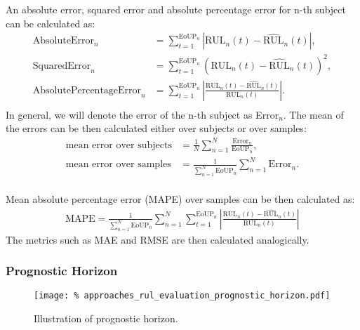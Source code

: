 An absolute error, squared error and absolute percentage error for n-th subject can be calculated as:
\begin{align*}
    \text{AbsoluteError}_n &= \sum_{t=1}^{\text{EoUP}_n}\left|\text{RUL}_n(t) - \widehat{\text{RUL}}_n(t)\right|,\\
    \text{SquaredError}_n &= \sum_{t=1}^{\text{EoUP}_n}{(\text{RUL}_n(t) - \widehat{\text{RUL}}_n(t))^2},\\
    \text{AbsolutePercentageError}_n &= \sum_{t=1}^{\text{EoUP}_n}\left|\frac{\text{RUL}_n(t) - \widehat{\text{RUL}}_n(t)}{\text{RUL}_n(t)}\right|.\\
\end{align*}
In general, we will denote the error of the n-th subject as Error$_n$.
The mean of the errors can be then calculated either over subjects or over samples:
\begin{align*}
    \text{mean error over subjects} &= \frac{1}{N}\sum_{n=1}^{N}\frac{\text{Error}_n}{\text{EoUP}_n},\\
    \text{mean error over samples} &= \frac{1}{\sum_{n=1}^N{{\text{EoUP}_n}}}\sum_{n=1}^{N}{\text{Error}_n}.\\
\end{align*}

Mean absolute percentage error (MAPE) over samples can be then calculated as:
\begin{align*}
    \text{MAPE} = \frac{1}{\sum_{n=1}^N{{\text{EoUP}_n}}}\sum_{n=1}^{N}{\sum_{t=1}^{\text{EoUP}_n}\left|\frac{\text{RUL}_n(t) - \widehat{\text{RUL}}_n(t)}{\text{RUL}_n(t)}\right|}
\end{align*}
The metrics such as MAE and RMSE are then calculated analogically.


\subsubsection{Prognostic Horizon}

\begin{figure}
    \centering
    \texttt{[image: \%
        approaches\_rul\_evaluation\_prognostic\_horizon.pdf]}
    \caption{Illustration of prognostic horizon.}
    \label{fig:approaches_rul_evaluation_prognostic_horizon}
\end{figure}


